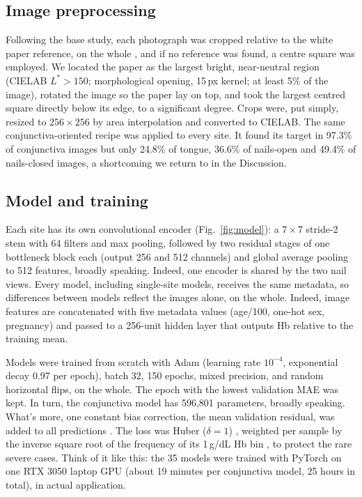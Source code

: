 \documentclass[10pt,a4paper,twocolumn]{article}
\newcommand{\gdl}{\,g/dL}
\begin{document}
\subsection{Image preprocessing}
Following the base study, each photograph was cropped relative to the white paper reference, on the whole \cite{desai2026}, and if no reference was found, a centre square was employed. We located the paper as the largest bright, near-neutral region (CIELAB $L^*>150$; morphological opening, 15\,px kernel; at least 5\% of the image), rotated the image so the paper lay on top, and took the largest centred square directly below its edge, to a significant degree. Crops were, put simply, resized to $256\times256$ by area interpolation and converted to CIELAB. The same conjunctiva-oriented recipe was applied to every site. It found its target in 97.3\% of conjunctiva images but only 24.8\% of tongue, 36.6\% of nails-open and 49.4\% of nails-closed images, a shortcoming we return to in the Discussion.

\subsection{Model and training}
Each site has its own convolutional encoder (Fig.~\ref{fig:model}): a $7\times7$ stride-2 stem with 64 filters and max pooling, followed by two residual stages \cite{he2016} of one bottleneck block each (output 256 and 512 channels) and global average pooling to 512 features, broadly speaking. Indeed, one encoder is shared by the two nail views. Every model, including single-site models, receives the same metadata, so differences between models reflect the images alone, on the whole. Indeed, image features are concatenated with five metadata values (age/100, one-hot sex, pregnancy) and passed to a 256-unit hidden layer that outputs Hb relative to the training mean.

Models were trained from scratch with Adam \cite{kingma2015} (learning rate $10^{-4}$, exponential decay 0.97 per epoch), batch 32, 150 epochs, mixed precision, and random horizontal flips, on the whole. The epoch with the lowest validation MAE was kept. In turn, the conjunctiva model has 596,801 parameters, broadly speaking. What's more, one constant bias correction, the mean validation residual, was added to all predictions \cite{desai2026}. The loss was Huber ($\delta=1$) \cite{huber1964}, weighted per sample by the inverse square root of the frequency of its 1\gdl{} Hb bin \cite{yang2021}, to protect the rare severe cases. Think of it like this: the 35 models were trained with PyTorch \cite{paszke2019} on one RTX 3050 laptop GPU (about 19 minutes per conjunctiva model, 25 hours in total), in actual application.
\end{document}

